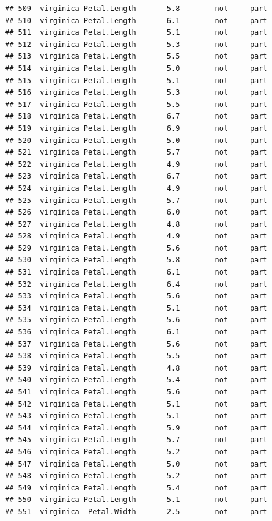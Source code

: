 \documentclass[krantz2]{krantz}\usepackage{knitr}%
\begin{document}
\begin{knitrout}
\begin{kframe}
\begin{verbatim}
## 509  virginica Petal.Length       5.8        not     part
## 510  virginica Petal.Length       6.1        not     part
## 511  virginica Petal.Length       5.1        not     part
## 512  virginica Petal.Length       5.3        not     part
## 513  virginica Petal.Length       5.5        not     part
## 514  virginica Petal.Length       5.0        not     part
## 515  virginica Petal.Length       5.1        not     part
## 516  virginica Petal.Length       5.3        not     part
## 517  virginica Petal.Length       5.5        not     part
## 518  virginica Petal.Length       6.7        not     part
## 519  virginica Petal.Length       6.9        not     part
## 520  virginica Petal.Length       5.0        not     part
## 521  virginica Petal.Length       5.7        not     part
## 522  virginica Petal.Length       4.9        not     part
## 523  virginica Petal.Length       6.7        not     part
## 524  virginica Petal.Length       4.9        not     part
## 525  virginica Petal.Length       5.7        not     part
## 526  virginica Petal.Length       6.0        not     part
## 527  virginica Petal.Length       4.8        not     part
## 528  virginica Petal.Length       4.9        not     part
## 529  virginica Petal.Length       5.6        not     part
## 530  virginica Petal.Length       5.8        not     part
## 531  virginica Petal.Length       6.1        not     part
## 532  virginica Petal.Length       6.4        not     part
## 533  virginica Petal.Length       5.6        not     part
## 534  virginica Petal.Length       5.1        not     part
## 535  virginica Petal.Length       5.6        not     part
## 536  virginica Petal.Length       6.1        not     part
## 537  virginica Petal.Length       5.6        not     part
## 538  virginica Petal.Length       5.5        not     part
## 539  virginica Petal.Length       4.8        not     part
## 540  virginica Petal.Length       5.4        not     part
## 541  virginica Petal.Length       5.6        not     part
## 542  virginica Petal.Length       5.1        not     part
## 543  virginica Petal.Length       5.1        not     part
## 544  virginica Petal.Length       5.9        not     part
## 545  virginica Petal.Length       5.7        not     part
## 546  virginica Petal.Length       5.2        not     part
## 547  virginica Petal.Length       5.0        not     part
## 548  virginica Petal.Length       5.2        not     part
## 549  virginica Petal.Length       5.4        not     part
## 550  virginica Petal.Length       5.1        not     part
## 551  virginica  Petal.Width       2.5        not     part

\end{verbatim}
\end{kframe}
\end{knitrout}
\end{document}
